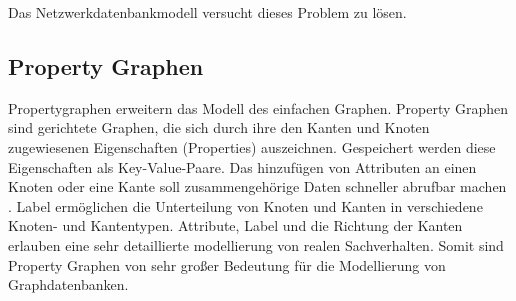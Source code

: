 Das Netzwerkdatenbankmodell versucht dieses Problem zu lösen.
%
\subsection{Property Graphen}
Propertygraphen erweitern das Modell des einfachen Graphen.
Property Graphen sind gerichtete Graphen, die sich durch ihre den Kanten und Knoten zugewiesenen Eigenschaften (Properties) auszeichnen.
Gespeichert werden diese Eigenschaften als Key-Value-Paare.
Das hinzufügen von Attributen an einen Knoten oder eine Kante soll zusammengehörige Daten schneller abrufbar machen \cite{angles2012comparison}.
Label ermöglichen die Unterteilung von Knoten und Kanten in verschiedene Knoten- und Kantentypen.
Attribute, Label und die Richtung der Kanten erlauben eine sehr detaillierte modellierung von realen Sachverhalten.
Somit sind Property Graphen von sehr großer Bedeutung für die Modellierung von Graphdatenbanken.

